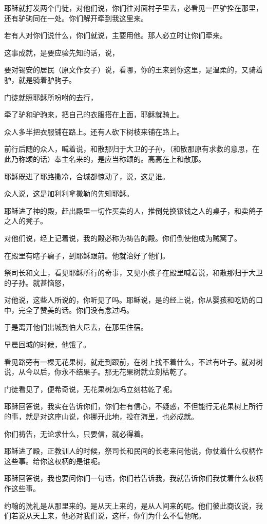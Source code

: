 \documentclass[12pt,oneside]{book}
\begin{document}
耶稣就打发两个门徒，对他们说，你们往对面村子里去，必看见一匹驴拴在那里，还有驴驹同在一处。你们解开牵到我这里来。

若有人对你们说什么，你们就说，主要用他。那人必立时让你们牵来。

这事成就，是要应验先知的话，说，

要对锡安的居民（原文作女子）说，看哪，你的王来到你这里，是温柔的，又骑着驴，就是骑着驴驹子。

门徒就照耶稣所吩咐的去行，

牵了驴和驴驹来，把自己的衣服搭在上面，耶稣就骑上。

众人多半把衣服铺在路上。还有人砍下树枝来铺在路上。

前行后随的众人，喊着说，和散那归于大卫的子孙，（和散那原有求救的意思，在此乃称颂的话）奉主名来的，是应当称颂的。高高在上和散那。

耶稣既进了耶路撒冷，合城都惊动了，说，这是谁。

众人说，这是加利利拿撒勒的先知耶稣。

耶稣进了神的殿，赶出殿里一切作买卖的人，推倒兑换银钱之人的桌子，和卖鸽子之人的凳子。

对他们说，经上记着说，我的殿必称为祷告的殿。你们倒使他成为贼窝了。

在殿里有瞎子瘸子，到耶稣跟前。他就治好了他们。

祭司长和文士，看见耶稣所行的奇事，又见小孩子在殿里喊着说，和散那归于大卫的子孙。就甚恼怒，

对他说，这些人所说的，你听见了吗。耶稣说，是的经上说，你从婴孩和吃奶的口中，完全了赞美的话。你们没有念过吗。

于是离开他们出城到伯大尼去，在那里住宿。

早晨回城的时候，他饿了。

看见路旁有一棵无花果树，就走到跟前，在树上找不着什么，不过有叶子。就对树说，从今以后，你永不结果子。那无花果树就立刻枯乾了。

门徒看见了，便希奇说，无花果树怎吗立刻枯乾了呢。

耶稣回答说，我实在告诉你们，你们若有信心，不疑惑，不但能行无花果树上所行的事，就是对这座山说，你挪开此地，投在海里，也必成就。

你们祷告，无论求什么，只要信，就必得着。

耶稣进了殿，正教训人的时候，祭司长和民间的长老来问他说，你仗着什么权柄作这些事。给你这权柄的是谁呢。

耶稣回答说，我也要问你们一句话，你们若告诉我，我就告诉你们我仗着什么权柄作这些事。

约翰的洗礼是从那里来的。是从天上来的，是从人间来的呢。他们彼此商议说，我们若说从天上来，他必对我们说，这样，你们为什么不信他呢。
\end{document}
